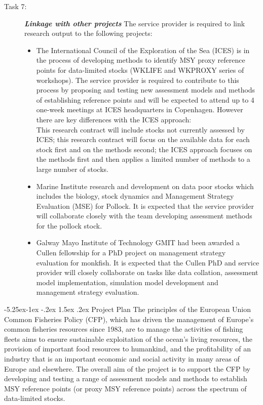 \documentclass[a4paper, 10pt]{article}
\makeatletter
\renewcommand{\section}{\@startsection{section}{1}{\z@}%
  {-5.25ex\@plus -1ex \@minus -.2ex}%
  {1.5ex \@plus .2ex}%
  {\normalfont\bfseries}}
\makeatother
\begin{document}
\begin{description}
 \item[Task 7:] \textbf{\textit{Linkage with other projects}} The service provider is required to link research output to the following projects: 
 \begin{itemize}
  \item The International Council of the Exploration of the Sea (ICES) is in the process of developing methods to identify MSY proxy reference points for data-limited stocks (WKLIFE and WKPROXY series of workshops). The service provider is required to contribute to this process by proposing and testing new assessment models and methods of establishing reference points and will be expected to attend up to 4 one-week meetings at ICES headquarters in Copenhagen. However there are key differences with the ICES approach: \\
This research contract will include stocks not currently assessed by ICES;
this research contract will focus on the available data for each stock first and on the methods second; the ICES approach focuses on the methods first and then applies a limited number of methods to a large number of stocks.
\item Marine Institute research and development on data poor stocks which includes the biology, stock dynamics and Management Strategy Evaluation (MSE) for Pollock.  It is expected that the service provider will collaborate closely with the team developing assessment methods for the pollock stock.
\item Galway Mayo Institute of Technology GMIT had been awarded a Cullen fellowship for a PhD project on management strategy evaluation for monkfish. It is expected that the Cullen PhD and service provider will closely collaborate on tasks like data collation, assessment model implementation, simulation model development and management strategy evaluation. 
\end{itemize}
\end{description}


\section{Project Plan}
The principles of the European Union Common Fisheries Policy (CFP), which has driven the management of Europe's common fisheries resources since 1983, are to manage the activities of fishing fleets aims to ensure sustainable exploitation of the ocean's living resources, the provision of important food resources to humankind, and the profitability of an industry that is an important economic and social activity in many areas of Europe and elsewhere. The overall aim of the project is to support the CFP by developing and testing a range of assessment models and methods to establish MSY reference points (or proxy MSY reference points) across the spectrum of data-limited stocks. 
\end{document}
